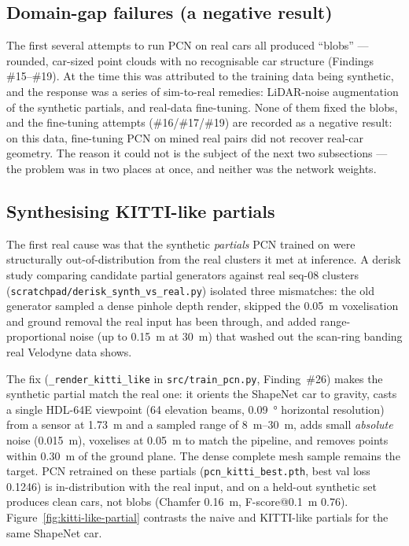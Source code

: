 \subsection{Domain-gap failures (a negative result)}
\label{sec:completion-domaingap}

The first several attempts to run PCN on real cars all produced ``blobs'' ---
rounded, car-sized point clouds with no recognisable car structure (Findings
\#15--\#19). At the time this was attributed to the training data being
synthetic, and the response was a series of sim-to-real remedies: LiDAR-noise
augmentation of the synthetic partials, and real-data fine-tuning. None of them
fixed the blobs, and the fine-tuning attempts (\#16/\#17/\#19) are recorded as a
negative result: on this data, fine-tuning PCN on mined real pairs did not
recover real-car geometry. The reason it could not is the subject of the next two
subsections --- the problem was in two places at once, and neither was the network
weights.

\subsection{Synthesising KITTI-like partials}
\label{sec:completion-kittilike}

The first real cause was that the synthetic \emph{partials} PCN trained on were
structurally out-of-distribution from the real clusters it met at inference. A
derisk study comparing candidate partial generators against real seq-08 clusters
(\texttt{scratchpad/derisk\_synth\_vs\_real.py}) isolated three mismatches: the
old generator sampled a dense pinhole depth render, skipped the
\SI{0.05}{\meter} voxelisation and ground removal the real input has been
through, and added range-proportional noise (up to \SI{0.15}{\meter} at
\SI{30}{\meter}) that washed out the scan-ring banding real Velodyne data shows.

The fix (\texttt{\_render\_kitti\_like} in \texttt{src/train\_pcn.py},
Finding~\#26) makes the synthetic partial match the real one: it orients the
ShapeNet car to gravity, casts a single HDL-64E viewpoint (64 elevation beams,
\SI{0.09}{\degree} horizontal resolution) from a sensor at \SI{1.73}{\meter} and
a sampled range of \SIrange{8}{30}{\meter}, adds small \emph{absolute} noise
(\SI{0.015}{\meter}), voxelises at \SI{0.05}{\meter} to match the pipeline, and
removes points within \SI{0.30}{\meter} of the ground plane. The dense complete
mesh sample remains the target. PCN retrained on these partials
(\texttt{pcn\_kitti\_best.pth}, best val loss \num{0.1246}) is in-distribution
with the real input, and on a held-out synthetic set produces clean cars, not
blobs (Chamfer \SI{0.16}{\meter}, F-score@\SI{0.1}{\meter} \num{0.76}).
Figure~\ref{fig:kitti-like-partial} contrasts the naive and KITTI-like partials
for the same ShapeNet car.


